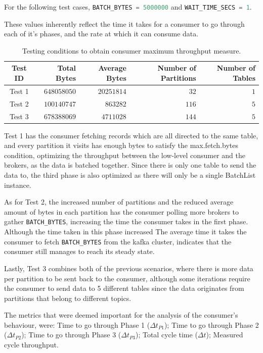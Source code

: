For the following test cases, \lstinline[language=Python]{BATCH_BYTES = 5000000} and \lstinline[language=Python]{WAIT_TIME_SECS = 1}.

These values inherently reflect the time it takes for a consumer to go through each of it's phases, and the rate at which it can consume data.

\begin{table}[H]
\centering
\caption{Testing conditions to obtain consumer maximum throughput measure.}
\begin{tabular}{ |c|r|r|r|r| } 
    \hline
    \textbf{Test ID} & \textbf{Total Bytes} & \textbf{Average Bytes} & \textbf{Number of Partitions} & \textbf{Number of Tables} \\ 
    \hline
    Test 1 & $648058050$ & $20251814$ & $32$ & $1$ \\
    Test 2 & $100140747$ & $863282$ & $116$ & $5$ \\
    Test 3 & $678388069$ & $4711028$ & $144$ & $5$ \\
    \hline
\end{tabular}
\end{table}

Test 1 has the consumer fetching records which are all directed to the same table, and every partition it visits has enough bytes to satisfy the max.fetch.bytes condition, optimizing the throughput between the low-level consumer and the brokers, as the data is batched together. Since there is only one table to send the data to, the third phase is also optimized as there will only be a single BatchList instance.

As for Test 2, the increased number of partitions and the reduced average amount of bytes in each partition has the consumer polling more brokers to gather \lstinline[language=Python]{BATCH_BYTES}, increasing the time the consumer takes in the first phase. Although the time taken in this phase increased The average time it takes the consumer to fetch \lstinline[language=Python]{BATCH_BYTES} from the kafka cluster, indicates that the consumer still manages to reach its steady state.

Lastly, Test 3 combines both of the previous scenarios, where there is more data per partition to be sent back to the consumer, although some iterations require the consumer to send data to 5 different tables since the data originates from partitions that belong to different topics.

The metrics that were deemed important for the analysis of the consumer's behaviour, were: Time to go through Phase 1 ($\Delta t_{P1}$); Time to go through Phase 2 ($\Delta t_{P2}$); Time to go through Phase 3 ($\Delta t_{P3}$); Total cycle time ($\Delta t$); Measured cycle throughput.

